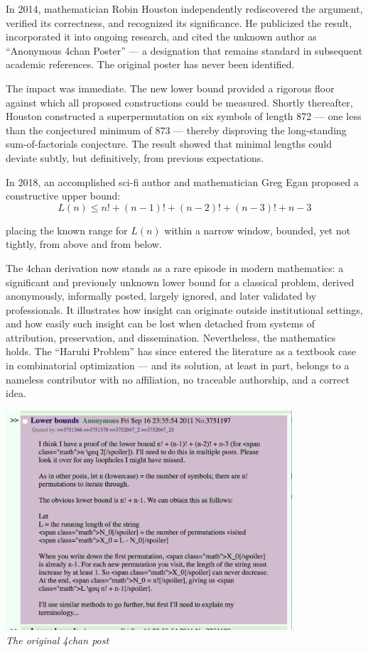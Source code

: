 In 2014, mathematician Robin Houston independently rediscovered the argument, verified its correctness, and recognized its significance. He publicized the result, incorporated it into ongoing research, and cited the unknown author as “Anonymous 4chan Poster” — a designation that remains standard in subsequent academic references. The original poster has never been identified.

The impact was immediate. The new lower bound provided a rigorous floor against which all proposed constructions could be measured. Shortly thereafter, Houston constructed a superpermutation on six symbols of length 872 — one less than the conjectured minimum of 873 — thereby disproving the long-standing sum-of-factorials conjecture. The result showed that minimal lengths could deviate subtly, but definitively, from previous expectations.

In 2018, an accomplished sci-fi author and mathematician Greg Egan proposed a constructive upper bound:
$$
L(n) \leq n! + (n-1)! + (n-2)! + (n-3)! + n - 3
$$

placing the known range for $L(n)$ within a narrow window, bounded, yet not tightly, from above and from below.

The 4chan derivation now stands as a rare episode in modern mathematics: a significant and previously unknown lower bound for a classical problem, derived anonymously, informally posted, largely ignored, and later validated by professionals. It illustrates how insight can originate outside institutional settings, and how easily such insight can be lost when detached from systems of attribution, preservation, and dissemination. Nevertheless, the mathematics holds. The “Haruhi Problem” has since entered the literature as a textbook case in combinatorial optimization — and its solution, at least in part, belongs to a nameless contributor with no affiliation, no traceable authorship, and a correct idea.

\vspace{4em}
\begin{center}
   \includegraphics[width=0.8\textwidth]{39_SuperpermutationsBreakthrough/DrTcMa7VYAApwpb.png}\\
   {\small\textit{The original 4chan post}}
\end{center}






